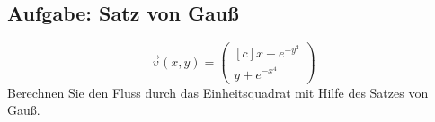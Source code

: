 \subsection{Aufgabe: Satz von Gauß}
\begin{equation}
\vec{v} (x, y) =
\begin{pmatrix*}[c]
    x + e^{−y^2} \\
    y + e^{−x^4}
\end{pmatrix*}
\end{equation}
 Berechnen Sie den Fluss durch das Einheitsquadrat mit Hilfe des Satzes von Gauß.
